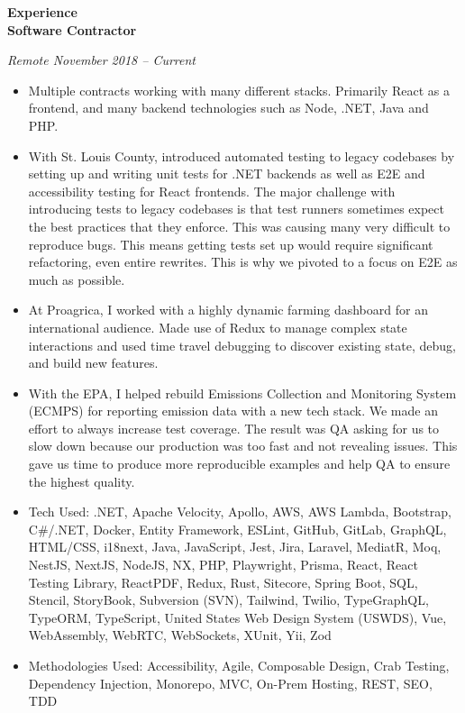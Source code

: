 \documentclass[a4ppaper, 10pt]{article}
\newcommand{\heading}[1]{\vspace{6pt}\noindent\textbf{\large #1}\vspace{4pt}\\}
\newcommand{\subheading}[1]{\vspace{2pt}\noindent\textbf{#1}\par}
\begin{document}
	\heading{Experience}
	\subheading{Software Contractor}
	\raggedright
	\textit{Remote \hfill November 2018 -- Current} \\
	\begin{itemize}[itemsep=0pt, topsep=2pt]
		\item Multiple contracts working with many different stacks. Primarily React as a frontend, and many backend technologies such as Node, .NET, Java and PHP.
		\item With St. Louis County, introduced automated testing to legacy codebases by setting up and writing unit tests for .NET backends as well as E2E and accessibility testing for React frontends. The major challenge with introducing tests to legacy codebases is that test runners sometimes expect the best practices that they enforce. This was causing many very difficult to reproduce bugs. This means getting tests set up would require significant refactoring, even entire rewrites. This is why we pivoted to a focus on E2E as much as possible.
		\item At Proagrica, I worked with a highly dynamic farming dashboard for an international audience. Made use of Redux to manage complex state interactions and used time travel debugging to discover existing state, debug, and build new features.
		\item With the EPA, I helped rebuild Emissions Collection and Monitoring System (ECMPS) for reporting emission data with a new tech stack. We made an effort to always increase test coverage. The result was QA asking for us to slow down because our production was too fast and not revealing issues. This gave us time to produce more reproducible examples and help QA to ensure the highest quality.
		\item Tech Used: .NET, Apache Velocity, Apollo, AWS, AWS Lambda, Bootstrap, C\#/.NET, Docker, Entity Framework, ESLint, GitHub, GitLab, GraphQL, HTML/CSS, i18next, Java, JavaScript, Jest, Jira, Laravel, MediatR, Moq, NestJS, NextJS, NodeJS, NX, PHP, Playwright, Prisma, React, React Testing Library, ReactPDF, Redux, Rust, Sitecore, Spring Boot, SQL, Stencil, StoryBook, Subversion (SVN), Tailwind, Twilio, TypeGraphQL, TypeORM, TypeScript, United States Web Design System (USWDS), Vue, WebAssembly, WebRTC, WebSockets, XUnit, Yii, Zod
		\item Methodologies Used: Accessibility, Agile, Composable Design, Crab Testing, Dependency Injection, Monorepo, MVC, On-Prem Hosting, REST, SEO, TDD
	\end{itemize}
\end{document}

